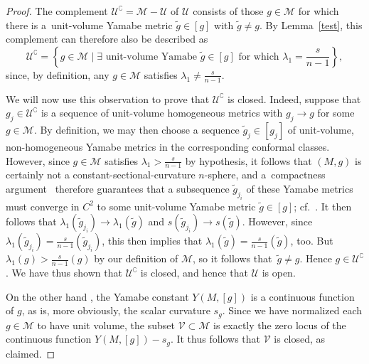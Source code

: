 \documentclass[pdftex]{sigma}
\numberwithin{equation}{section}
\begin{document}
\begin{proof} The complement $\mathscr{U}^\complement = \mathscr{M} -\mathscr{U}$ of $\mathscr{U}$ consists
of those $g\in \mathscr{M}$ for which there is a~unit-volume Yamabe metric $\tilde{g}\in [g]$ with $\tilde{g}\neq g$.
By Lemma~\ref{test}, this complement can therefore also be described as
\begin{equation*}
\mathscr{U}^\complement =\left\{ g\in \mathscr{M} \mid \exists \text{ unit-volume Yamabe $\tilde{g}\in [g]$ for which } \lambda_1 = \frac{s}{n-1}\right\},
\end{equation*}
since, by definition, any $g\in \mathscr{M}$ satisfies $\lambda_1 \neq \frac{s}{n-1}$.

We will now use this observation to prove that $\mathscr{U}^\complement$ is closed. Indeed, suppose that $g_j\in \mathscr{U}^\complement$
is a sequence of unit-volume homogeneous metrics with $g_j \to g$ for some $g\in \mathscr{M}$.
By definition, we may then choose a sequence $\tilde{g}_j\in [g_j]$ of unit-volume, non-homogeneous
 Yamabe metrics in the corresponding conformal classes.
However, since $g\in\mathscr{M}$ satisfies $\lambda_1 > \frac{s}{n-1}$ by hypothesis, it follows that
$(M,g)$ is certainly not a constant-sectional-curvature $n$-sphere, and a~compactness argument~\cite[p.~716]{bwz}
therefore guarantees that a subsequence
$\tilde{g}_{j_i}$ of these Yamabe metrics must converge in $C^{2}$ to some unit-volume Yamabe metric $\tilde{g}\in [g]$; cf.\ \cite[Proposition~2.1]{sch}.
It then follows that $\lambda_1 (\tilde{g}_{j_i}) \to \lambda_1 (\tilde{g})$ and $s(\tilde{g}_{j_i})\to s(\tilde{g})$.
However, since $\lambda_1 (\tilde{g}_{j_i}) = \frac{s}{n-1}(\tilde{g}_{j_i})$, this then implies that $\lambda_1 (\tilde{g})= \frac{s}{n-1} (\tilde{g})$,
 too. But $\lambda_1 ({g})> \frac{s}{n-1} (g)$ by our definition of $\mathscr{M}$, so it follows that~$\tilde{g}\neq g$. Hence
 $g\in \mathscr{U}^\complement$. We have
thus shown that $\mathscr{U}^\complement$ is closed, and hence that $\mathscr{U}$ is open.

On the other hand \cite[Proposition~4.31]{bes}, the Yamabe constant $Y(M, [g])$ is a continuous function of $g$, as is, more obviously, the scalar curvature $s_g$. Since we have
normalized each $g\in \mathscr{M}$ to have unit volume, the subset $\mathscr{V}\subset \mathscr{M}$ is exactly
the zero locus of the continuous function $Y(M, [g])-s_g$. It thus follows that $\mathscr{V}$ is closed, as claimed.
\end{proof}
\end{document}
